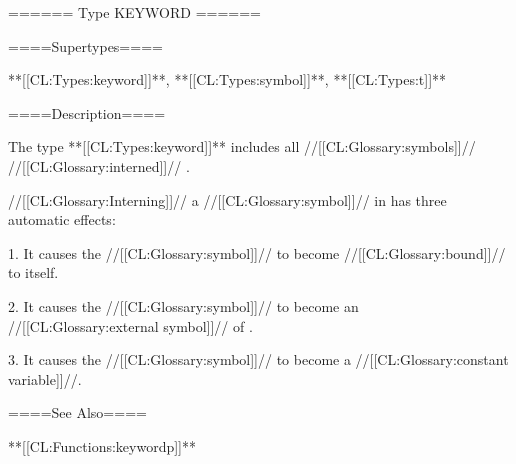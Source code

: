 ====== Type KEYWORD ======

====Supertypes====

**[[CL:Types:keyword]]**, **[[CL:Types:symbol]]**, **[[CL:Types:t]]**

====Description====

The type **[[CL:Types:keyword]]** includes all //[[CL:Glossary:symbols]]// //[[CL:Glossary:interned]]// .

//[[CL:Glossary:Interning]]// a //[[CL:Glossary:symbol]]// in  has three automatic effects:

\beginlist \item{1.} It causes the //[[CL:Glossary:symbol]]// to become //[[CL:Glossary:bound]]// to itself. \item{2.} It causes the //[[CL:Glossary:symbol]]// to become an //[[CL:Glossary:external symbol]]// of . \item{3.} It causes the //[[CL:Glossary:symbol]]// to become a //[[CL:Glossary:constant variable]]//. \endlist

====See Also====

**[[CL:Functions:keywordp]]**

